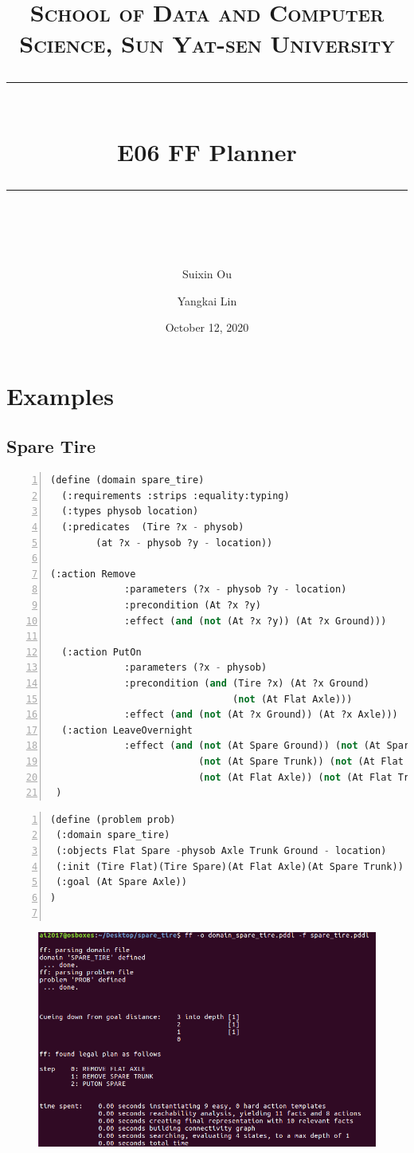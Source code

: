 ﻿\documentclass[a4paper, 11pt]{article}
\title{	
\normalfont \normalsize
\textsc{School of Data and Computer Science, Sun Yat-sen University} \\ [25pt] %
\rule{\textwidth}{0.5pt} \\[0.4cm] %
\huge  E06 FF Planner \\ %
\rule{\textwidth}{2pt} \\[0.5cm] %
\author{Suixin Ou \and Yangkai Lin}
\date{\normalsize October 12, 2020}
}
\begin{document}
\maketitle
\tableofcontents
\newpage

\section{Examples}

\subsection{Spare Tire}
\label{sec:spare-tire}

\begin{lstlisting}[title=domain\_spare\_tire.pddl,frame=single,language=lisp,numbers=left]
(define (domain spare_tire)
  (:requirements :strips :equality:typing)
  (:types physob location) 
  (:predicates  (Tire ?x - physob)
		(at ?x - physob ?y - location))

(:action Remove
             :parameters (?x - physob ?y - location)
             :precondition (At ?x ?y)
             :effect (and (not (At ?x ?y)) (At ?x Ground)))

  (:action PutOn
             :parameters (?x - physob)
             :precondition (and (Tire ?x) (At ?x Ground) 
                                (not (At Flat Axle)))
             :effect (and (not (At ?x Ground)) (At ?x Axle)))
  (:action LeaveOvernight
             :effect (and (not (At Spare Ground)) (not (At Spare Axle)) 
                          (not (At Spare Trunk)) (not (At Flat Ground)) 
                          (not (At Flat Axle)) (not (At Flat Trunk)) ))
 )

\end{lstlisting}
\begin{lstlisting}[title=spare\_tire.pddl,frame=single,language=lisp,numbers=left]
(define (problem prob)
 (:domain spare_tire)
 (:objects Flat Spare -physob Axle Trunk Ground - location)
 (:init (Tire Flat)(Tire Spare)(At Flat Axle)(At Spare Trunk))
 (:goal (At Spare Axle))
)


\end{lstlisting}
\begin{figure}[h]
  \centering
  \includegraphics[width=16cm]{Pic/spare_tire}
\end{figure}
\end{document}
